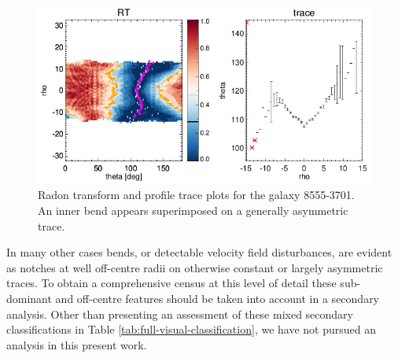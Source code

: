 \begin{figure}
    \centering
    \includegraphics[width=\columnwidth]{images/RadonPlots/RT-SNIPS-NEW/8555-3701-A+IB.png}
    \caption[Radon transform and profile trace plots for the galaxy 8555-3701]{Radon transform and profile trace plots for the galaxy 8555-3701. An inner bend appears superimposed on a generally asymmetric trace.}
    \label{fig:8555-3701-A+IB}
\end{figure}

In many other cases bends, or detectable velocity field disturbances, are evident as notches at well off-centre radii on otherwise constant or largely asymmetric traces. To obtain a comprehensive census at this level of detail these sub-dominant and off-centre features should be taken into account in a secondary analysis. Other than presenting an assessment of these mixed secondary classifications in Table \ref{tab:full-visual-classification}, we have not pursued an analysis in this present work.




